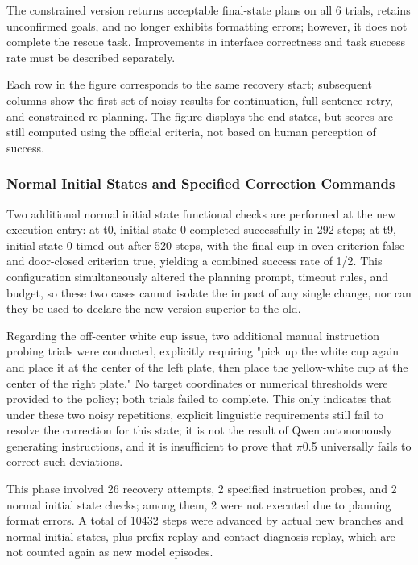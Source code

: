 The constrained version returns acceptable final-state plans on all 6 trials, retains unconfirmed goals, and no longer exhibits formatting errors; however, it does not complete the rescue task. Improvements in interface correctness and task success rate must be described separately.


Each row in the figure corresponds to the same recovery start; subsequent columns show the first set of noisy results for continuation, full-sentence retry, and constrained re-planning. The figure displays the end states, but scores are still computed using the official criteria, not based on human perception of success.

\subsubsection{Normal Initial States and Specified Correction Commands}\label{s10-detail-6}

Two additional normal initial state functional checks are performed at the new execution entry: at t0, initial state 0 completed successfully in 292 steps; at t9, initial state 0 timed out after 520 steps, with the final cup-in-oven criterion false and door-closed criterion true, yielding a combined success rate of 1/2. This configuration simultaneously altered the planning prompt, timeout rules, and budget, so these two cases cannot isolate the impact of any single change, nor can they be used to declare the new version superior to the old.

Regarding the off-center white cup issue, two additional manual instruction probing trials were conducted, explicitly requiring "pick up the white cup again and place it at the center of the left plate, then place the yellow-white cup at the center of the right plate." No target coordinates or numerical thresholds were provided to the policy; both trials failed to complete. This only indicates that under these two noisy repetitions, explicit linguistic requirements still fail to resolve the correction for this state; it is not the result of Qwen autonomously generating instructions, and it is insufficient to prove that \(\pi\)0.5 universally fails to correct such deviations.

This phase involved 26 recovery attempts, 2 specified instruction probes, and 2 normal initial state checks; among them, 2 were not executed due to planning format errors. A total of 10432 steps were advanced by actual new branches and normal initial states, plus prefix replay and contact diagnosis replay, which are not counted again as new model episodes.

